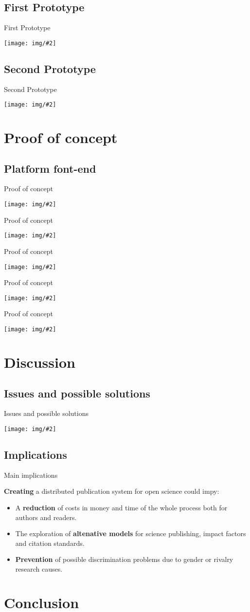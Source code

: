 \documentclass{beamer}
\newcommand{\framei}[2]{
  \begin{frame}{#1}
    \begin{center}
      \texttt{[image: img/\#2]}
    \end{center}
  \end{frame}
}
\newcommand{\framet}[2]{
  \begin{frame}{#1}
    #2
  \end{frame}
}
\begin{document}
\subsection{First Prototype}
\framei{First Prototype}{UML_class_1.png}
\subsection{Second Prototype}
\framei{Second Prototype}{UML_class_2.png}

\section{Proof of concept}
\subsection{Platform font-end}
\framei{Proof of concept}{mockup.png}
\framei{Proof of concept}{homepage.png}
\framei{Proof of concept}{journal.PNG}
\framei{Proof of concept}{paper.PNG}
\framei{Proof of concept}{rating.png}

\section{Discussion}
\subsection{Issues and possible solutions}
\framei{Issues and possible solutions}{privacyReviewRating.jpg}

\subsection{Implications}
\framet{Main implications}{
\textbf{Creating} a distributed publication system for open science could impy:
\begin{itemize}
  \item A \textbf{reduction} of costs in money and time of the whole process both for authors and readers.
  \item The exploration of \textbf{altenative models} for science publishing, impact factors and citation standards.
  \item \textbf{Prevention} of possible discrimination problems due to gender or rivalry research causes.
\end{itemize}
}

\section{Conclusion}
\end{document}
